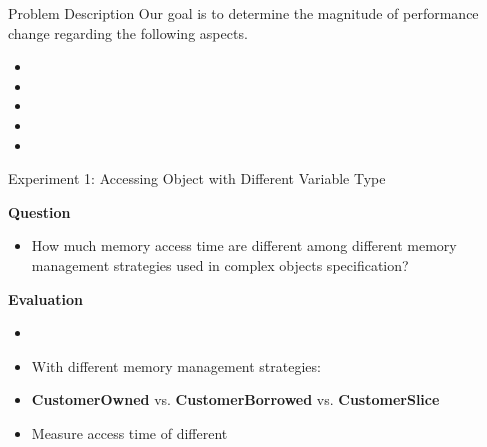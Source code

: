 \documentclass[9pt]{beamer}
\begin{document}


\begin{frame}[fragile]{Problem Description}
    Our goal is to determine the magnitude of performance change regarding the following aspects. 
    \vspace{0.5cm}
    \begin{itemize}
        \item {}
        \item {}
        \item {}
        \item {}
        \item {}
    \end{itemize}
\end{frame}


\begin{frame}[fragile]{Experiment 1: Accessing Object with Different Variable Type}

    \textbf{Question}
    \begin{itemize}
        \item How much memory access time are different among different memory management strategies used in complex objects specification?
    \end{itemize}

    \vspace{0.5cm}

    \textbf{Evaluation}
    \begin{itemize}
        \item {}
        \item With different memory management strategies: 
        \item \textbf{CustomerOwned} vs. \textbf{CustomerBorrowed} vs. \textbf{CustomerSlice}
        \item Measure access time of different 
    \end{itemize}

\end{frame}
\end{document}
